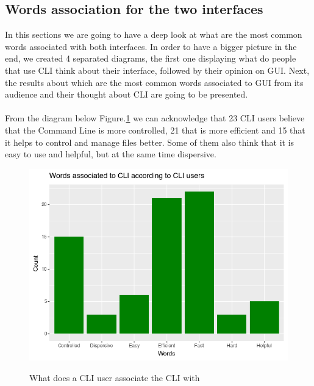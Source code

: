 \documentclass[]{report}
\begin{document}
	\subsection{Words association for the two interfaces}
	
	In this sections we are going to have a deep look at what are the most common words associated with both interfaces. In order to have a bigger picture in the end, we created 4 separated diagrams, the first one displaying what do people that use CLI think about their interface, followed by their opinion on GUI. Next, the results about which are the most common words associated to GUI from its audience and their thought about CLI are going to be presented.\\\\

	From the diagram below Figure.\ref{fig: 15} we can acknowledge that 23 CLI users believe that the Command Line is more controlled, 21 that is more efficient and 15 that it helps to control and manage files better. Some of them also think that it is easy to use and helpful, but at the same time dispersive.
	\begin{figure}[H]
		\centering
		\includegraphics[width=0.75\linewidth]{WordsCLIFromCLI}\\
		\caption{What does a CLI user associate the CLI with}
		\label{fig: 15}
	\end{figure}
	
\end{document}
